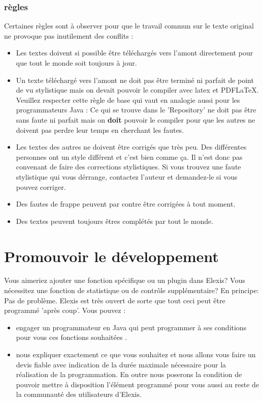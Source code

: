 \subsection{règles}
Certaines règles sont à observer pour que le travail commun sur le texte original ne provoque pas inutilement des conflits :
\begin{itemize}
  \item Les textes doivent si possible être téléchargés vers l'amont directement pour que tout le monde soit toujours à jour.
  \item Un texte téléchargé vers l'amont ne doit pas être terminé ni parfait de point de vu stylistique mais on devait pouvoir le compiler avec latex et PDFLaTeX. Veuillez respecter cette règle de base qui vaut en analogie aussi pour les programmateurs Java :  Ce qui se trouve dans le 'Repository' ne doit pas être sans faute ni parfait mais on \textbf{doit} pouvoir le compiler pour que les autres ne doivent pas perdre leur temps en cherchant les fautes.
  \item Les textes des autres ne doivent être corrigés que très peu. Des différentes personnes ont un style différent et c'est bien comme ça. Il n'est donc pas convenant de faire des corrections stylistiques. Si vous trouvez une faute stylistique qui vous dérrange, contactez l'auteur et demandez-le si vous pouvez corriger. 
  \item Des fautes de frappe peuvent par contre être corrigées à tout moment.
  \item Des textes peuvent toujours êtres complétés par tout le monde.
\end{itemize}

\chapter{Promouvoir le développement}
Vous aimeriez ajouter une fonction spécifique ou un plugin dans Elexis?
Vous nécessitez une fonction de statistique ou de contrôle supplémentaire? En principe: Pas de problème.
Elexis est très ouvert de sorte que tout ceci peut être programmé 'après coup'. Vous pouvez :
\begin{itemize}
  \item engager un programmateur en Java qui peut programmer à ses conditions pour vous ces fonctions souhaitées .
  \item nous expliquer exactement ce que vous souhaitez et nous allons vous faire un devis fiable avec indication de la durée maximale nécessaire pour la réalisation de la programmation. En outre nous poserons la condition de pouvoir mettre à disposition l'élément programmé pour vous aussi au reste de la communauté des utilisateurs d'Elexis. \end{itemize}
